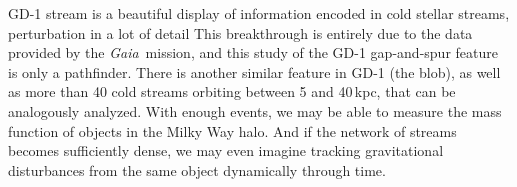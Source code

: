 \documentclass[twocolumn]{aastex62}
\newcommand{\acronym}[1]{{\small{#1}}}
\newcommand{\gaia}{\textsl{Gaia}}
\newcommand{\lcdm}{\acronym{$\Lambda$CDM}}
\newcommand{\msun}{\textrm{M}_\odot}
\begin{document}
GD-1 stream is a beautiful display of information encoded in cold stellar streams, perturbation in a lot of detail
This breakthrough is entirely due to the data provided by the \gaia\ mission, and this study of the GD-1 gap-and-spur feature is only a pathfinder.
There is another similar feature in GD-1 (the blob), as well as more than 40 cold streams orbiting between 5 and 40\,kpc, that can be analogously analyzed.
With enough events, we may be able to measure the mass function of objects in the Milky Way halo.
And if the network of streams becomes sufficiently dense, we may even imagine tracking gravitational disturbances from the same object dynamically through time.


% 
% 
% 
% 
% 
% 
% 
% 
\end{document}
